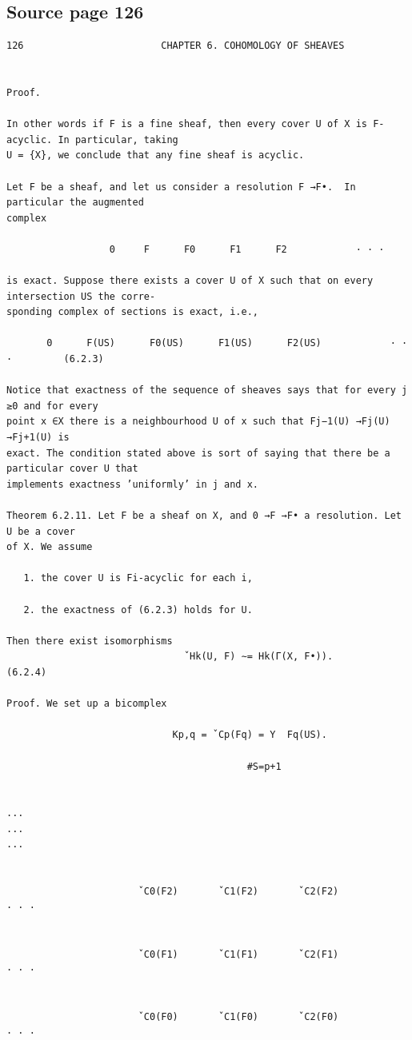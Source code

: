\subsection*{Source page 126}
\begin{Verbatim}[fontsize=\small]
126                        CHAPTER 6. COHOMOLOGY OF SHEAVES


Proof.

In other words if F is a fine sheaf, then every cover U of X is F-acyclic. In particular, taking
U = {X}, we conclude that any fine sheaf is acyclic.

Let F be a sheaf, and let us consider a resolution F →F•.  In particular the augmented
complex

                  0     F      F0      F1      F2            · · ·

is exact. Suppose there exists a cover U of X such that on every intersection US the corre-
sponding complex of sections is exact, i.e.,

       0      F(US)      F0(US)      F1(US)      F2(US)            · · ·         (6.2.3)

Notice that exactness of the sequence of sheaves says that for every j ≥0 and for every
point x ∈X there is a neighbourhood U of x such that Fj−1(U) →Fj(U) →Fj+1(U) is
exact. The condition stated above is sort of saying that there be a particular cover U that
implements exactness ’uniformly’ in j and x.

Theorem 6.2.11. Let F be a sheaf on X, and 0 →F →F• a resolution. Let U be a cover
of X. We assume

   1. the cover U is Fi-acyclic for each i,

   2. the exactness of (6.2.3) holds for U.

Then there exist isomorphisms
                               ˇHk(U, F) ∼= Hk(Γ(X, F•)).                            (6.2.4)

Proof. We set up a bicomplex

                             Kp,q = ˇCp(Fq) = Y  Fq(US).

                                          #S=p+1

                                                                                                                          ...                                                                  ...                                                                  ...


                       ˇC0(F2)       ˇC1(F2)       ˇC2(F2)            · · ·


                       ˇC0(F1)       ˇC1(F1)       ˇC2(F1)            · · ·


                       ˇC0(F0)       ˇC1(F0)       ˇC2(F0)            · · ·
\end{Verbatim}

